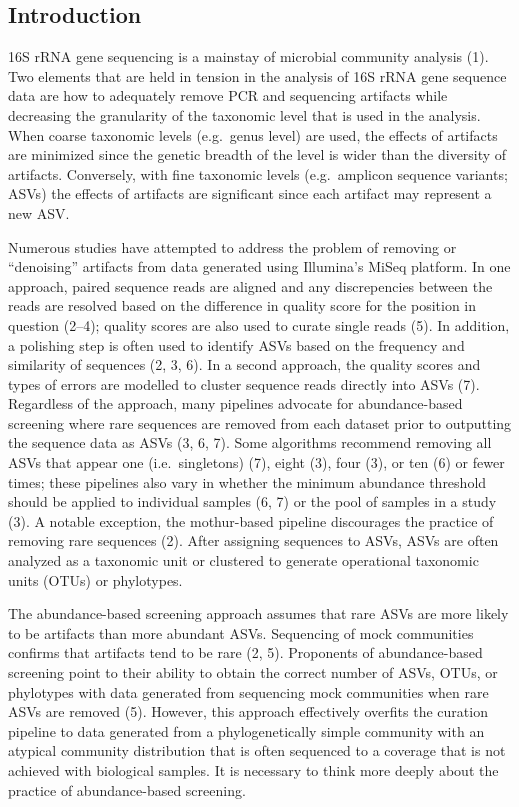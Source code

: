 \documentclass[
]{article}
\begin{document}
\newpage

\hypertarget{introduction}{%
\subsection{Introduction}\label{introduction}}

16S rRNA gene sequencing is a mainstay of microbial community analysis
(1). Two elements that are held in tension in the analysis of 16S rRNA
gene sequence data are how to adequately remove PCR and sequencing
artifacts while decreasing the granularity of the taxonomic level that
is used in the analysis. When coarse taxonomic levels (e.g.~genus level)
are used, the effects of artifacts are minimized since the genetic
breadth of the level is wider than the diversity of artifacts.
Conversely, with fine taxonomic levels (e.g.~amplicon sequence variants;
ASVs) the effects of artifacts are significant since each artifact may
represent a new ASV.

Numerous studies have attempted to address the problem of removing or
``denoising'' artifacts from data generated using Illumina's MiSeq
platform. In one approach, paired sequence reads are aligned and any
discrepencies between the reads are resolved based on the difference in
quality score for the position in question (2--4); quality scores are
also used to curate single reads (5). In addition, a polishing step is
often used to identify ASVs based on the frequency and similarity of
sequences (2, 3, 6). In a second approach, the quality scores and types
of errors are modelled to cluster sequence reads directly into ASVs (7).
Regardless of the approach, many pipelines advocate for abundance-based
screening where rare sequences are removed from each dataset prior to
outputting the sequence data as ASVs (3, 6, 7). Some algorithms
recommend removing all ASVs that appear one (i.e.~singletons) (7), eight
(3), four (3), or ten (6) or fewer times; these pipelines also vary in
whether the minimum abundance threshold should be applied to individual
samples (6, 7) or the pool of samples in a study (3). A notable
exception, the mothur-based pipeline discourages the practice of
removing rare sequences (2). After assigning sequences to ASVs, ASVs are
often analyzed as a taxonomic unit or clustered to generate operational
taxonomic units (OTUs) or phylotypes.

The abundance-based screening approach assumes that rare ASVs are more
likely to be artifacts than more abundant ASVs. Sequencing of mock
communities confirms that artifacts tend to be rare (2, 5). Proponents
of abundance-based screening point to their ability to obtain the
correct number of ASVs, OTUs, or phylotypes with data generated from
sequencing mock communities when rare ASVs are removed (5). However,
this approach effectively overfits the curation pipeline to data
generated from a phylogenetically simple community with an atypical
community distribution that is often sequenced to a coverage that is not
achieved with biological samples. It is necessary to think more deeply
about the practice of abundance-based screening.
\end{document}
